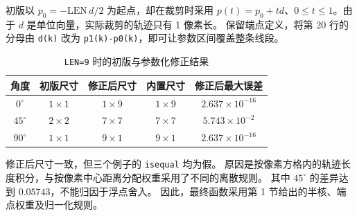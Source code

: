初版以 $p_0=-\mathrm{LEN}\,d/2$ 为起点，却在裁剪时采用
$p(t)=p_0+td$、$0\le t\le1$。由于 $d$ 是单位向量，实际裁剪的轨迹只有 1 像素长。
保留端点定义，将第 20 行的分母由 \texttt{d(k)} 改为
\texttt{p1(k)-p0(k)}，即可让参数区间覆盖整条线段。

\begin{table}[H]\centering\small
\caption{\texttt{LEN=9} 时的初版与参数化修正结果}
\begin{tabular}{ccccc}
\toprule
角度 & 初版尺寸 & 修正后尺寸 & 内置尺寸 & 修正后最大误差\\
\midrule
$0^\circ$ & $1\times1$ & $1\times9$ & $1\times9$ & $2.637\times10^{-16}$\\
$45^\circ$ & $2\times2$ & $7\times7$ & $7\times7$ & $5.743\times10^{-2}$\\
$90^\circ$ & $1\times1$ & $9\times1$ & $9\times1$ & $2.637\times10^{-16}$\\
\bottomrule
\end{tabular}
\end{table}

修正后尺寸一致，但三个例子的 \texttt{isequal} 均为假。
原因是按像素方格内的轨迹长度积分，与按像素中心距离分配权重采用了不同的离散规则。
其中 $45^\circ$ 的差异达到 $0.05743$，不能归因于浮点舍入。
因此，最终函数采用第 1 节给出的半核、端点权重及归一化规则。
